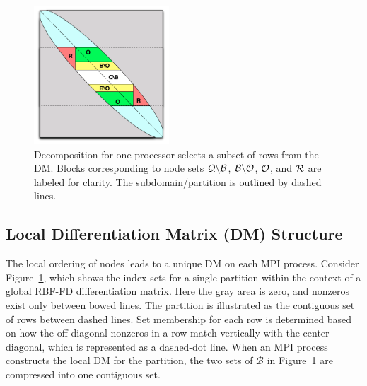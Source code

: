 \documentclass{report}
\begin{document}
\begin{figure}
\begin{center}
\includegraphics[width=0.45\textwidth]{rbffd_methods_content/decompositions/MatrixDecompositionSets_RBF-FD_Bowed.pdf} 
\caption{Decomposition for one processor selects a subset of rows from the DM. Blocks corresponding to node sets $\mathcal{Q} \backslash \mathcal{B}$, $\mathcal{B} \backslash \mathcal{O}$, $\mathcal{O}$, and $\mathcal{R}$ are labeled for clarity. The subdomain/partition is outlined by dashed lines.}
\label{fig:decomp_matrix_view}
\end{center}
\end{figure}

\subsection{Local Differentiation Matrix (DM) Structure}

The local ordering of nodes leads to a unique DM on each MPI process. Consider Figure~\ref{fig:decomp_matrix_view}, which shows the index sets for a single partition within the context of a global RBF-FD differentiation matrix. Here the gray area is zero, and nonzeros exist only between bowed lines. The partition is illustrated as the contiguous set of rows between dashed lines. Set membership for each row is determined based on how the off-diagonal nonzeros in a row match vertically with the center diagonal, which is represented as a dashed-dot line. When an MPI process constructs the local DM for the partition, the two sets of $\mathcal{B}$ in Figure~\ref{fig:decomp_matrix_view} are compressed into one contiguous set. %
\end{document}
